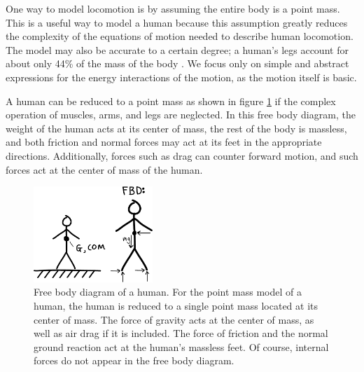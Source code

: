 One way to model locomotion is by assuming the entire body is a point mass. This is a useful way to model a human because this assumption greatly reduces the complexity of the equations of motion needed to describe human locomotion. The model may also be accurate to a certain degree; a human's legs account for about only 44\% of the mass of the body \cite{winter92} . We focus only on simple and abstract expressions for the energy interactions of the motion, as the motion itself is basic.  

A human can be reduced to a point mass as shown in figure \ref{fig:PersonFBD} if the complex operation of muscles, arms, and legs are neglected. In this free body diagram, the weight of the human acts at its center of mass, the rest of the body is massless, and both friction and normal forces may act at its feet in the appropriate directions. Additionally, forces such as drag can counter forward motion, and such forces act at the center of mass of the human. 

\begin{figure}[h]		%
\begin{centering}
\includegraphics[width=0.4\textwidth]{Figures/PersonFBD}\par
\end{centering}
\caption[Diagram: Free Body Diagram of a Human]{Free body diagram of a human. For the point mass model of a human, the human is reduced to a single point mass located at its center of mass. The force of gravity acts at the center of mass, as well as air drag if it is included. The force of friction and the normal ground reaction act at the human's massless feet. Of course, internal forces do not appear in the free body diagram.}
\label{fig:PersonFBD}
\end{figure}
%

